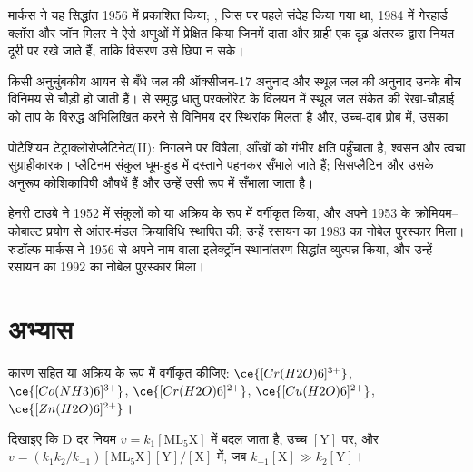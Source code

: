 मार्कस ने यह सिद्धांत 1956 में प्रकाशित किया; , जिस पर पहले संदेह किया गया था,
1984 में गेरहार्ड क्लॉस और जॉन मिलर ने ऐसे अणुओं में प्रेक्षित किया जिनमें दाता और
ग्राही एक दृढ़ अंतरक द्वारा नियत दूरी पर रखे जाते हैं, ताकि विसरण
उसे छिपा न सके।

\begin{inthelab}[ऑक्सीजन-17 NMR द्वारा जल विनिमय]
किसी अनुचुंबकीय आयन से बँधे जल की ऑक्सीजन-17 अनुनाद और स्थूल
जल की अनुनाद उनके बीच विनिमय से चौड़ी हो जाती हैं।  से समृद्ध धातु परक्लोरेट के विलयन में
स्थूल जल संकेत की रेखा-चौड़ाई को ताप के विरुद्ध अभिलिखित करने से
विनिमय दर स्थिरांक मिलता है और, उच्च-दाब प्रोब में,
उसका ।
\end{inthelab}

\begin{safety}{}
पोटैशियम टेट्राक्लोरोप्लैटिनेट(II): निगलने पर विषैला, आँखों को गंभीर
क्षति पहुँचाता है, श्वसन और त्वचा सुग्राहीकारक। प्लैटिनम संकुल
धूम-हुड में दस्ताने पहनकर सँभाले जाते हैं; सिसप्लैटिन और उसके अनुरूप कोशिकाविषी औषधें हैं और
उन्हें उसी रूप में सँभाला जाता है।
\end{safety}

\begin{history}[टाउबे और मार्कस]
हेनरी टाउबे ने 1952 में संकुलों को  या अक्रिय के रूप में वर्गीकृत किया, और अपने
1953 के क्रोमियम--कोबाल्ट प्रयोग से आंतर-मंडल क्रियाविधि स्थापित की; उन्हें
रसायन का 1983 का नोबेल पुरस्कार मिला। रुडॉल्फ मार्कस ने 1956 से अपने नाम वाला
इलेक्ट्रॉन स्थानांतरण सिद्धांत व्युत्पन्न किया, और उन्हें रसायन का 1992 का नोबेल
पुरस्कार मिला।
\end{history}

\section{अभ्यास}

\begin{exercise}[$\star$]\label{exo:b3:complex-mechanisms:1}
कारण सहित  या अक्रिय के रूप में वर्गीकृत कीजिए: $\ce{[Cr(H2O)6]^{3+}}$, $\ce{[Co(NH3)6]^{3+}}$, $\ce{[Cr(H2O)6]^{2+}}$,
$\ce{[Cu(H2O)6]^{2+}}$, $\ce{[Zn(H2O)6]^{2+}}$।
\end{exercise}

\begin{exercise}[$\star$]\label{exo:b3:complex-mechanisms:2}
दिखाइए कि D दर नियम $v = k_1[\mathrm{ML_5X}]$ में बदल जाता है, उच्च $[\mathrm Y]$ पर, और $v = (k_1k_2/k_{-1})
[\mathrm{ML_5X}][\mathrm Y]/[\mathrm X]$ में, जब $k_{-1}[\mathrm X] \gg k_2[\mathrm Y]$।
\end{exercise}

